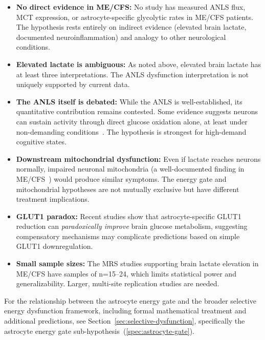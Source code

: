 \begin{itemize}
    \item \textbf{No direct evidence in ME/CFS:} No study has measured ANLS flux, MCT expression, or astrocyte-specific glycolytic rates in ME/CFS patients. The hypothesis rests entirely on indirect evidence (elevated brain lactate, documented neuroinflammation) and analogy to other neurological conditions.

    \item \textbf{Elevated lactate is ambiguous:} As noted above, elevated brain lactate has at least three interpretations. The ANLS dysfunction interpretation is not uniquely supported by current data.

    \item \textbf{The ANLS itself is debated:} While the ANLS is well-established, its quantitative contribution remains contested. Some evidence suggests neurons can sustain activity through direct glucose oxidation alone, at least under non-demanding conditions~\cite{Kim2025ANLS}. The hypothesis is strongest for high-demand cognitive states.

    \item \textbf{Downstream mitochondrial dysfunction:} Even if lactate reaches neurons normally, impaired neuronal mitochondria (a well-documented finding in ME/CFS~\cite{Syed2025}) would produce similar symptoms. The energy gate and mitochondrial hypotheses are not mutually exclusive but have different treatment implications.

    \item \textbf{GLUT1 paradox:} Recent studies show that astrocyte-specific GLUT1 reduction can \emph{paradoxically improve} brain glucose metabolism, suggesting compensatory mechanisms may complicate predictions based on simple GLUT1 downregulation.

    \item \textbf{Small sample sizes:} The MRS studies supporting brain lactate elevation in ME/CFS have samples of n=15--24, which limits statistical power and generalizability. Larger, multi-site replication studies are needed.
\end{itemize}

For the relationship between the astrocyte energy gate and the broader selective energy dysfunction framework, including formal mathematical treatment and additional predictions, see Section~\ref{sec:selective-dysfunction}, specifically the astrocyte energy gate sub-hypothesis~(\ref{spec:astrocyte-gate}).

